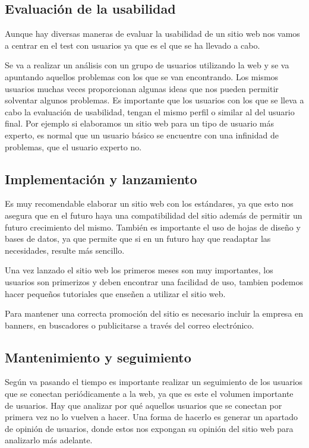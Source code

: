 \subsection{Evaluación de la usabilidad}
Aunque hay diversas maneras de evaluar la usabilidad de un sitio web nos vamos a centrar en el test con usuarios ya que es el que se ha llevado a cabo.

Se va a realizar un análisis con un grupo de usuarios utilizando la web y se va apuntando aquellos problemas con los que se van encontrando. Los mismos usuarios muchas veces proporcionan algunas ideas que nos pueden permitir solventar algunos problemas. Es importante que los usuarios con los que se lleva a cabo la evaluación de usabilidad, tengan el mismo perfil o similar al del usuario final. Por ejemplo si elaboramos un sitio web para un tipo de usuario más experto, es normal que un usuario básico se encuentre con una infinidad de problemas, que el usuario experto no.

\subsection{Implementación y lanzamiento}
Es muy recomendable elaborar un sitio web con los estándares, ya que esto nos asegura que en el futuro haya una compatibilidad del sitio además de permitir un futuro crecimiento del mismo.
También es importante el uso de hojas de diseño y bases de datos, ya que permite que si en un futuro hay que readaptar las necesidades, resulte más sencillo.

Una vez lanzado el sitio web los primeros meses son muy importantes, los usuarios son primerizos y deben encontrar una facilidad de uso, tambien podemos hacer pequeños tutoriales que enseñen a utilizar el sitio web.

Para mantener una correcta promoción del sitio es necesario incluir la empresa en banners, en buscadores o publicitarse a través del correo electrónico.

\subsection{Mantenimiento y seguimiento}
Según va pasando el tiempo es importante realizar un seguimiento de los usuarios que se conectan periódicamente a la web, ya que es este el volumen importante de usuarios. Hay que analizar por qué aquellos usuarios que se conectan por primera vez no lo vuelven a hacer. Una forma de hacerlo es generar un apartado de opinión de usuarios, donde estos nos expongan su opinión del sitio web para analizarlo más adelante.

